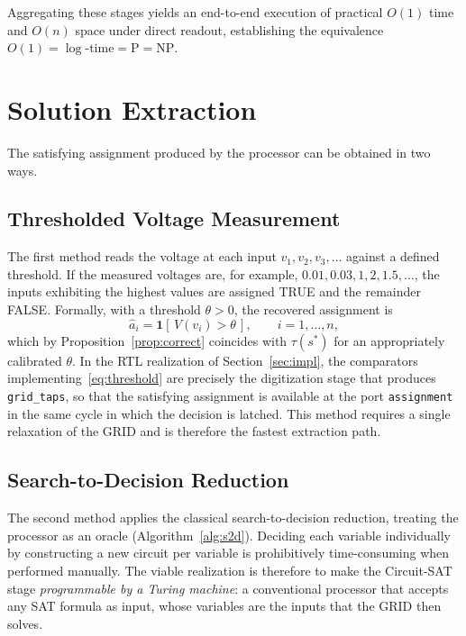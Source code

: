 \documentclass[letterpaper,journal]{IEEEtran}
\begin{document}
Aggregating these stages yields an end-to-end execution of practical $O(1)$ time and $O(n)$ space under direct readout, establishing the equivalence $O(1) = \log\text{-time} = \text{P} = \text{NP}$.

\section{Solution Extraction}
\label{sec:extraction}

The satisfying assignment produced by the processor can be obtained in two
ways.

\subsection{Thresholded Voltage Measurement}
The first method reads the voltage at each input $v_1, v_2, v_3, \dots$
against a defined threshold. If the measured voltages are, for example,
$0.01, 0.03, 1, 2, 1.5, \dots$, the inputs exhibiting the highest values are
assigned TRUE and the remainder FALSE. Formally, with a threshold
$\theta>0$, the recovered assignment is
\begin{equation}
\hat{a}_i=\mathbf{1}[\,V(v_i)>\theta\,],\qquad i=1,\dots,n,
\label{eq:threshold}
\end{equation}
which by Proposition~\ref{prop:correct} coincides with $\tau(s^{*})$ for an
appropriately calibrated $\theta$. In the RTL realization of
Section~\ref{sec:impl}, the comparators implementing~\eqref{eq:threshold}
are precisely the digitization stage that produces \texttt{grid\_taps}, so
that the satisfying assignment is available at the port
\texttt{assignment} in the same cycle in which the decision is latched.
This method requires a single relaxation of the GRID and is therefore the
fastest extraction path.

\subsection{Search-to-Decision Reduction}
The second method applies the classical search-to-decision reduction,
treating the processor as an oracle (Algorithm~\ref{alg:s2d}). Deciding each
variable individually by constructing a new circuit per variable is
prohibitively time-consuming when performed manually. The viable
realization is therefore to make the Circuit-SAT stage \emph{programmable
by a Turing machine}: a conventional processor that accepts any SAT formula
as input, whose variables are the inputs that the GRID then solves.
\end{document}
